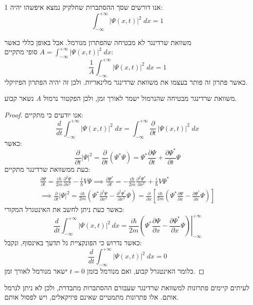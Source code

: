 \documentclass{tstextbook}
\begin{document}
\begin{definition}[נרמול]
אנו דורשים שסך ההסתברות שחלקיק נמצא איפשהו יהיה 1:
$$\int_{-\infty}^{+\infty}|\Psi(x,t)|^{2}\;d x=1$$

\end{definition}
\begin{proposition}
משוואת שרדינגר לא מבטיחה שהפתרון מנורמל. אבל באופן כללי כאשר \(A=\int_{-\infty}^{+\infty}|\Psi(x,t)|^{2}\;d x\) סופי מתקיים:
$$\frac{1}{A}\int_{-\infty}^{+\infty}|\Psi(x,t)|^{2}\;d x=1$$
כאשר פתרון זה פותר בעצמו את משוואת שרדינגר מלינאריות. ולכן זה יהיה הפתרון הפיזיקלי.

\end{proposition}
\begin{proposition}
משוואת שרדינגר מבטיחה שהנרמול ישמר לאורך זמן, ולכן הפקטור נרמול \(A\) נשאר קבוע.

\end{proposition}
\begin{proof}
אנו יודעים כי מתקיים:
$${\frac{d}{d t}}\int_{-\infty}^{+\infty}|\Psi(x,t)|^{2}\;d x=\int_{-\infty}^{+\infty}{\frac{\partial}{\partial t}}\,|\Psi(x,t)|^{2}\;d x$$
כאשר:
$${\frac{\partial}{\partial t}}\left|\Psi\right|^{2}={\frac{\partial}{\partial t}}\left(\Psi^{*}\Psi\right)=\Psi^{*}{\frac{\partial\Psi}{\partial t}}+{\frac{\partial\Psi^{*}}{\partial t}}\Psi$$
כעת ממשוואת שרדינגר מתקיים:
$$\begin{gather}{\frac{\partial\Psi}{\partial t}}={\frac{i\hbar}{2m}}{\frac{\partial^{2}\Psi}{\partial x^{2}}}-{\frac{i}{\hbar}}V\Psi \implies{\frac{\partial\Psi^{*}}{\partial t}}=-{\frac{i\hbar}{2m}}{\frac{\partial^{2}\Psi^{*}}{\partial x^{2}}}+{\frac{i}{\hbar}}V\Psi^{*}  \\\implies {\frac{\partial}{\partial t}}\left|\Psi\right|^{2}={\frac{i\hbar}{2m}}\left(\Psi^{*}{\frac{\partial^{2}\Psi}{\partial x^{2}}}-{\frac{\partial^{2}\Psi^{*}}{\partial x^{2}}}\Psi\right)={\frac{\partial}{\partial x}}\left[{\frac{i\hbar}{2m}}\left(\Psi^{*}{\frac{\partial\Psi}{\partial x}}-{\frac{\partial\Psi^{*}}{\partial x}}\Psi\right)\right]
\end{gather}$$
כאשר כעת ניתן לחשב את האינטגרל המקורי:
$$\frac{d}{d t}\int_{-\infty}^{+\infty}|\Psi(x,t)|^{2}\ d x=\frac{i\hbar}{2m}\left.\left(\Psi^{*}\frac{\partial\Psi}{\partial x}-\frac{\partial\Psi^{*}}{\partial x}\Psi\right)\right|_{-\infty}^{+\infty}$$
כאשר נדרוש כי הפונקציית גל תדעך באינסוף, ונקבל:
$$\frac{d}{d t}\int_{-\infty}^{+\infty}|\Psi(x,t)|^{2}\;d x=0$$
כלומר האינטגרל קבוע, ואם מנורמל בזמן \(t=0\) ישאר מנורמל לאורך זמן.

\end{proof}
\begin{remark}
לעיתים קיימים פתרונות למשוואת שרדינגר שעבורם ההסתברות מתבדרת, ולכן לא ניתן לנרמל אותם. אלו פתרונות מתמטיים שאינם פיזיקאלים, ויש לפסול אותם.

\end{remark}
\end{document}
